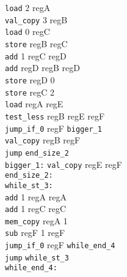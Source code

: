 \documentclass[10pt,landscape]{article}
\begin{document}
\begin{multicols}{3}
\begin{minipage}{0.2 	\textwidth}
		\verb!load! 2 regA\\
		\verb!val_copy! 3 regB \\
		\verb!load! 0 regC\\
		\verb!store! regB regC\\
		\verb!add! 1 regC regD\\
		\verb!add! regD regB regD\\
		\verb!store! regD 0\\
		\verb!store! regC 2\\
		\verb!load! regA regE\\
		\verb!test_less! regB regE regF\\
		\verb!jump_if_0! regF \verb!bigger_1!\\
		\verb!val_copy! regB regF \\
		\verb!jump!  \verb!end_size_2!\\
		\verb!bigger_1:!
		\verb!val_copy! regE regF \\
		\verb!end_size_2:!\\
		\verb!while_st_3:!\\
		\verb!add! 1 regA regA\\
		\verb!add! 1 regC regC\\
		\verb!mem_copy! regA 1\\
		\verb!sub! regF 1 regF\\
		\verb!jump_if_0! regF \verb!while_end_4!\\
		\verb!jump! \verb!while_st_3!\\
		\verb!while_end_4:!\\
				
		
	\end{minipage}

	\end{multicols}
\end{document}
